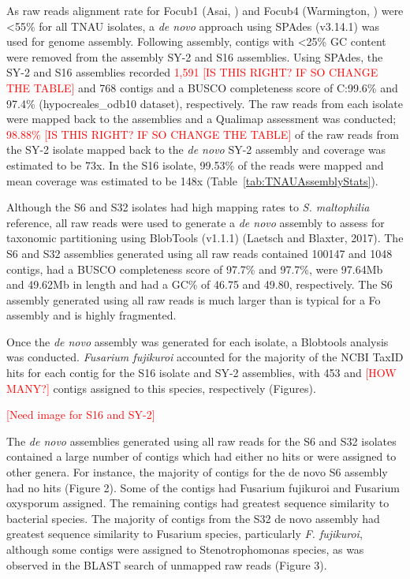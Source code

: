 As raw reads alignment rate for \ac{Focub1} (Asai, ) and \ac{Focub4} (Warmington, ) were <55\% for all TNAU isolates, a \textit{de novo} approach using SPAdes (v3.14.1) was used for genome assembly. Following assembly, contigs with \textless 25\% GC content were removed from the assembly SY-2 and S16 assemblies. Using SPAdes, the SY-2 and S16 assemblies recorded \textcolor{red}{1,591 [IS THIS RIGHT? IF SO CHANGE THE TABLE]} and 768 contigs and a BUSCO completeness score of C:99.6\% and 97.4\% (hypocreales\_odb10 dataset), respectively. The raw reads from each isolate were mapped back to the assemblies and a Qualimap assessment was conducted; \textcolor{red}{98.88\% [IS THIS RIGHT? IF SO CHANGE THE TABLE]} of the raw reads from the SY-2 isolate mapped back to the \textit{de novo} SY-2 assembly and coverage was estimated to be 73x. In the S16 isolate, 99.53\% of the reads were mapped and mean coverage was estimated to be 148x (Table~\ref{tab:TNAUAssemblyStats}).

Although the S6 and S32 isolates had high mapping rates to \textit{S. maltophilia} reference, all raw reads were used to generate a \textit{de novo} assembly to assess for taxonomic partitioning using BlobTools (v1.1.1) (Laetsch and Blaxter, 2017). The S6 and S32 assemblies generated using all raw reads contained 100147 and 1048 contigs, had a BUSCO completeness score of 97.7\% and 97.7\%, were 97.64Mb and 49.62Mb in length and had a GC\% of 46.75 and 49.80, respectively. The S6 assembly generated using all raw reads is much larger than is typical for a \ac{Fo} assembly and is highly fragmented. 

Once the \textit{de novo} assembly was generated for each isolate, a Blobtools analysis was conducted. \textit{Fusarium fujikuroi} accounted for the majority of the NCBI TaxID hits for each contig for the S16 isolate and SY-2 assemblies, with 453 and \textcolor{red}{[HOW MANY?]} contigs assigned to this species, respectively (Figures). 

\textcolor{red}{[Need image for S16 and SY-2]}

The \textit{de novo} assemblies generated using all raw reads for the S6 and S32 isolates contained a large number of contigs which had either no hits or were assigned to other genera. For instance, the majority of contigs for the de novo S6 assembly had no hits (Figure 2). Some of the contigs had Fusarium fujikuroi and Fusarium oxysporum assigned. The remaining contigs had greatest sequence similarity to bacterial species. The majority of contigs from the S32 de novo assembly had greatest sequence similarity to Fusarium species, particularly \textit{F. fujikuroi}, although some contigs were assigned to Stenotrophomonas species, as was observed in the BLAST search of unmapped raw reads (Figure 3). 


